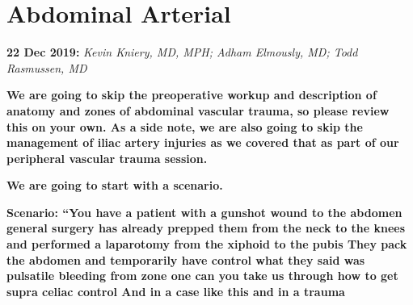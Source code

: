 \documentclass[
]{book}
\begin{document}
\hypertarget{abdominal-arterial}{%
\section{Abdominal Arterial}\label{abdominal-arterial}}

\textbf{22 Dec 2019:} \emph{Kevin Kniery, MD, MPH; Adham Elmously, MD; Todd
Rasmussen, MD}

\textbf{We are going to skip the preoperative workup and description of
anatomy and zones of abdominal vascular trauma, so please review this on
your own. As a side note, we are also going to skip the management of
iliac artery injuries as we covered that as part of our peripheral
vascular trauma session.}

\textbf{We are going to start with a scenario.}

\textbf{Scenario: ``You have a patient with a gunshot wound to the abdomen
general surgery has already prepped them from the neck to the knees and
performed a laparotomy from the xiphoid to the pubis They pack the
abdomen and temporarily have control what they said was pulsatile
bleeding from zone one can you take us through how to get supra celiac
control And in a case like this and in a trauma}
\end{document}
